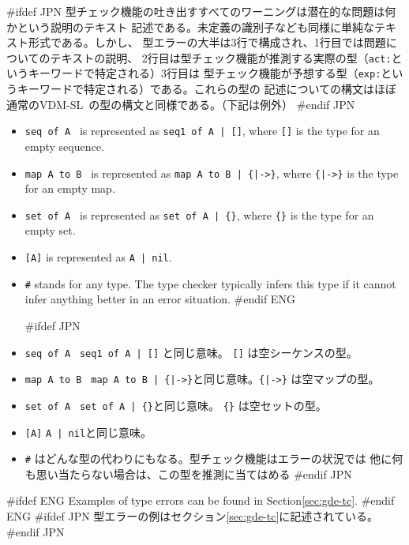 \documentclass[\pformat,12pt]{article}
\newcommand{\vdmslpp}{VDM-SL}
\newcommand{\vdmslpp}{VDM++}
\begin{document}
#ifdef JPN
型チェック機能の吐き出すすべてのワーニングは潜在的な問題は何かという説明のテキスト
記述である。未定義の識別子なども同様に単純なテキスト形式である。しかし、
型エラーの大半は3行で構成され、1行目では問題についてのテキストの説明、
2行目は型チェック機能が推測する実際の型（\texttt{act:}というキーワードで特定される）3行目は
型チェック機能が予想する型（\texttt{exp:}というキーワードで特定される）である。これらの型の
記述についての構文はほぼ通常の\vdmslpp\ の型の構文と同様である。（下記は例外）
#endif JPN

\begin{itemize}
#ifdef ENG
\item {\tt seq of A } is represented as {\tt seq1 of A | []}, where
  {\tt []} is the type for an empty sequence.
  
\item {\tt map A to B } is represented as {\tt map A to B | \{|->\}},
  where {\tt \{|->\}} is the type for an empty map.
  
\item {\tt set of A } is represented as {\tt set of A | \{\}}, where
  {\tt \{\}} is the type for an empty set.
  
\item {\tt [A]} is represented as {\tt A | nil}.
  
\item {\tt \#} stands for any type. The type checker typically infers
  this type if it cannot infer anything better in an error situation.
#endif ENG

#ifdef JPN
\item {\tt seq of A }  {\tt seq1 of A | []} と同じ意味。 {\tt []} は空シーケンスの型。
  
\item {\tt map A to B } {\tt map A to B | \{|->\}}と同じ意味。{\tt \{|->\}} は空マップの型。 
  
\item {\tt set of A } {\tt set of A | \{\}}と同じ意味。 {\tt \{\}} は空セットの型。
  
\item {\tt [A]}  {\tt A | nil}と同じ意味。
  
\item {\tt \#} はどんな型の代わりにもなる。型チェック機能はエラーの状況では
  他に何も思い当たらない場合は、この型を推測に当てはめる
#endif JPN
\end{itemize}

#ifdef ENG
Examples of type errors can be found in Section\ref{sec:gde-tc}.
#endif ENG
#ifdef JPN
型エラーの例はセクション\ref{sec:gde-tc}に記述されている。
#endif JPN
\end{document}
